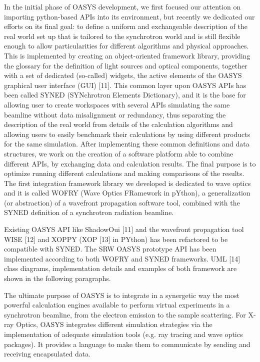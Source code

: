 \documentclass{aip-cp}
\begin{document}
In the initial phase of OASYS development, we first focused our attention on importing python-based APIs into its environment, but recently we dedicated our efforts on its final goal: to define a uniform and exchangeable description of the real world set up that is tailored to the synchrotron world and is still flexible enough to allow particularities for different algorithms and physical approaches. This is implemented by creating an object-oriented framework library, providing the glossary for the definition of light sources and optical components, together with a set of dedicated (so-called) widgets, the active elements of the OASYS graphical user interface (GUI) [11]. This common layer upon OASYS APIs has been called SYNED (SYNchrotron Elements Dictionary), and it is the base for allowing user to create workspaces with several APIs simulating the same beamline without data misalignment or redundancy, thus separating the description of the real world from details of the calculation algorithms and allowing users to easily benchmark their calculations by using different products for the same simulation.
After implementing these common definitions and data structures, we work on the creation of a software platform able to combine different APIs, by exchanging data and calculation results. The final purpose is to optimize running different calculations and making comparisons of the results. The first integration framework library we developed is dedicated to wave optics and it is called WOFRY (Wave Optics FRamework in pYthon), a generalization (or abstraction) of a wavefront propagation software tool, combined with the SYNED definition of a synchrotron radiation beamline.

Existing OASYS API like ShadowOui [11] and the wavefront propagation tool WISE [12] and XOPPY (XOP [13] in PYthon) has been refactored to be compatible with SYNED. The SRW OASYS prototype API has been implemented according to both WOFRY and SYNED frameworks. UML [14] class diagrams, implementation details and examples of both framework are shown in the following paragraphs.

The ultimate purpose of OASYS is to integrate in a synergetic way the most powerful calculation engines available to perform virtual experiments in a synchrotron beamline, from the electron emission to the sample scattering. For X-ray Optics, OASYS integrates different simulation strategies via the implementation of adequate simulation tools (e.g. ray tracing and wave optics packages). It provides a language to make them to communicate by sending and receiving encapsulated data.
\end{document}
